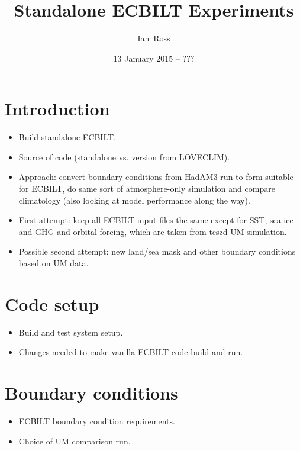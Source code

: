 \documentclass[a4paper,11pt,article]{memoir}
\title{Standalone ECBILT Experiments}
\author{Ian~Ross}
\date{13 January 2015 -- ???}
\begin{document}
\maketitle

\chapter{Introduction}

\begin{itemize}
  \item{Build standalone ECBILT.}
  \item{Source of code (standalone vs. version from LOVECLIM).}
  \item{Approach: convert boundary conditions from HadAM3 run to form
    suitable for ECBILT, do same sort of atmosphere-only simulation
    and compare climatology (also looking at model performance along
    the way).}
  \item{First attempt: keep all ECBILT input files the same except for
    SST, sea-ice and GHG and orbital forcing, which are taken from
    tcszd UM simulation.}
  \item{Possible second attempt: new land/sea mask and other boundary
    conditions based on UM data.}
\end{itemize}


\chapter{Code setup}

\begin{itemize}
  \item{Build and test system setup.}
  \item{Changes needed to make vanilla ECBILT code build and run.}
\end{itemize}


\chapter{Boundary conditions}

\begin{itemize}
  \item{ECBILT boundary condition requirements.}
  \item{Choice of UM comparison run.}
\end{itemize}
\end{document}
